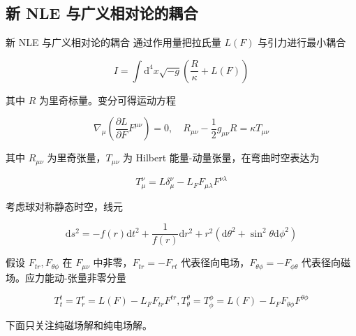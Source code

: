 \documentclass[9pt, dvipsnames]{beamer} %
\begin{document}
\subsection{新 NLE 与广义相对论的耦合}

\begin{frame}{新 NLE 与广义相对论的耦合}
    通过作用量把拉氏量 $L(F) $ 与引力进行最小耦合

    $$
    I
    =\int \mathrm{d}^4 x\sqrt{-g}\left(\frac{R }{\kappa } + L(F) \right) 
    $$
    
    其中 $R $ 为里奇标量。变分可得运动方程
    
    $$
    \nabla_\mu\left(\frac{\partial L }{\partial F } F^{\mu\nu} \right)
    =0,\quad
    R_{\mu\nu} - \frac{1 }{2 } g_{\mu\nu} R
    =\kappa T_{\mu\nu}
    $$
    
    其中 $R_{\mu\nu} $ 为里奇张量，$T_{\mu\nu} $ 为 Hilbert 能量-动量张量，在弯曲时空表达为
    
    $$
    T_\mu^\nu
    =L\delta_\mu^\nu - L_F F_{\mu\lambda} F^{\nu \lambda}
    $$
    
    考虑球对称静态时空，线元
    
    $$
    \mathrm{d}s^2
    =-f(r)\mathrm{d}t^2 + \frac{1 }{f(r) } \mathrm{d}r^2 + r^2\left(\mathrm{d}\theta^2+\sin^2\theta\mathrm{d}\phi^2 \right)
    $$
    
    假设 $F_{tr},F_{\theta\phi} $ 在 $F_{\mu\nu} $ 中非零，$F_{tr}=-F_{rt} $ 代表径向电场，$F_{\theta\phi}=-F_{\phi\theta} $ 代表径向磁场。应力能动-张量非零分量
    
    $$
    T_t^t = T_r^r
    =L(F) - L_F F_{tr}F^{tr},
    T_\theta^\theta
    =T_\phi^\phi
    =L(F) - L_F F_{\theta\phi}F^{\theta\phi}
    $$
    
    下面只关注纯磁场解和纯电场解。
\end{frame}
\end{document}
